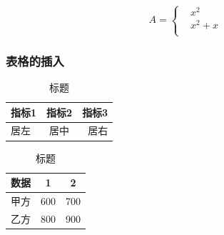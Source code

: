 \documentclass[UTF8]{ctexart}
\begin{document}
	\begin{equation}
		A=\begin{cases}
			&x^2\\&x^2+x\\
		\end{cases}
	\end{equation}
	
	\subsubsection{表格的插入}
	
	\begin{table}[!htbp]
		\centering
		\caption{标题}
		\begin{tabular}{|l|c|r|}
			
			\hline
			指标1&指标2&指标3\\
			\hline
			居左&居中&居右\\
			\hline
		\end{tabular}
	\end{table}
	
	
	\begin{table}[!htbp]
		\centering
		\caption{标题}
		\begin{tabular}{ccc}
			\toprule
			数据&1&2\\
			\midrule
			甲方&600&700\\
			乙方&800&900\\
			\bottomrule
		\end{tabular}
	\end{table}
\end{document}
